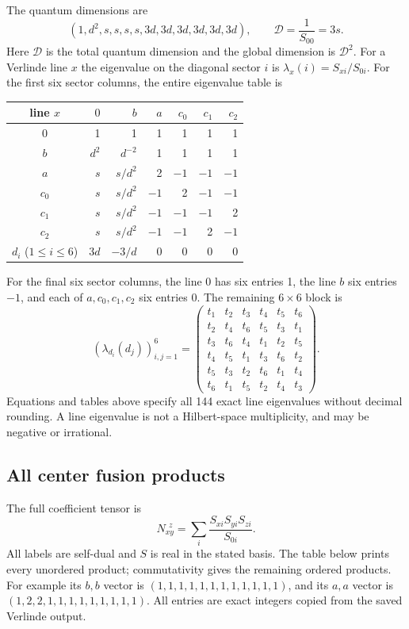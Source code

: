 The quantum dimensions are
\[
 (1,d^2,s,s,s,s,3d,3d,3d,3d,3d,3d),
 \qquad\mathcal D=\frac1{S_{00}}=3s.
\]
Here $\mathcal D$ is the total quantum dimension and the global
dimension is $\mathcal D^2$. For a Verlinde line $x$ the eigenvalue
on the diagonal sector $i$ is $\lambda_x(i)=S_{xi}/S_{0i}$.
For the first six sector columns, the entire eigenvalue table is
\begin{center}\small
\begin{tabular}{c|rrrrrr}
\toprule
line $x$&$0$&$b$&$a$&$c_0$&$c_1$&$c_2$\\
\midrule
$0$&1&1&1&1&1&1\\
$b$&$d^2$&$d^{-2}$&1&1&1&1\\
$a$&$s$&$s/d^2$&2&$-1$&$-1$&$-1$\\
$c_0$&$s$&$s/d^2$&$-1$&2&$-1$&$-1$\\
$c_1$&$s$&$s/d^2$&$-1$&$-1$&$-1$&2\\
$c_2$&$s$&$s/d^2$&$-1$&$-1$&2&$-1$\\
$d_i$ ($1\leq i\leq6$)&$3d$&$-3/d$&0&0&0&0\\
\bottomrule
\end{tabular}
\end{center}
For the final six sector columns, the line $0$ has six entries 1,
the line $b$ six entries $-1$, and each of $a,c_0,c_1,c_2$ six
entries 0. The remaining $6\times6$ block is
\begin{equation}
 (\lambda_{d_i}(d_j))_{i,j=1}^6=
 \begin{pmatrix}
 t_1&t_2&t_3&t_4&t_5&t_6\\
 t_2&t_4&t_6&t_5&t_3&t_1\\
 t_3&t_6&t_4&t_1&t_2&t_5\\
 t_4&t_5&t_1&t_3&t_6&t_2\\
 t_5&t_3&t_2&t_6&t_1&t_4\\
 t_6&t_1&t_5&t_2&t_4&t_3
 \end{pmatrix}.
 \label{expphysics:line-cosine-block}
\end{equation}
Equations and tables above specify all 144 exact line eigenvalues
without decimal rounding. A line eigenvalue is not a Hilbert-space
multiplicity, and may be negative or irrational.

\subsection{All center fusion products}

The full coefficient tensor is
\[
 N_{xy}^{\ \ z}=\sum_i\frac{S_{xi}S_{yi}S_{zi}}{S_{0i}}.
\]
All labels are self-dual and $S$ is real in the stated basis. The
table below prints every unordered product; commutativity gives
the remaining ordered products. For example its $b,b$ vector is
$(1,1,1,1,1,1,1,1,1,1,1,1)$, and its $a,a$ vector is
$(1,2,2,1,1,1,1,1,1,1,1,1)$. All entries are exact integers
copied from the saved Verlinde output.

